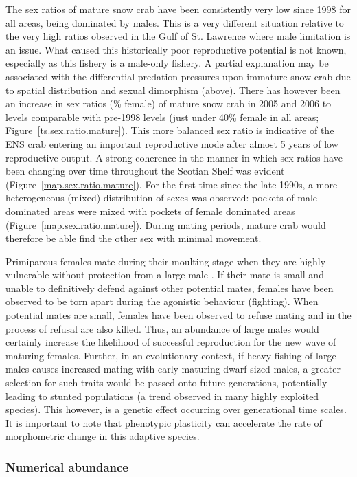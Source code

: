 \documentclass[11pt]{article}
\begin{document}
The sex ratios of mature snow crab have been consistently very low since 1998 for all areas, being dominated by males. This is a very different situation relative to the very high ratios observed in the Gulf of St. Lawrence where male limitation is an issue. What caused this historically poor reproductive potential is not known, especially as this fishery is a male-only fishery. A partial explanation may be associated with the differential predation pressures upon immature snow crab due to spatial distribution and sexual dimorphism (above). There has however been an increase in sex ratios (\% female) of mature snow crab in 2005 and 2006 to levels comparable with pre-1998 levels (just under 40\% female in all areas; Figure~\ref{ts.sex.ratio.mature}). This more balanced sex ratio is indicative of the ENS crab entering an important reproductive mode after almost 5 years of low reproductive output. A strong coherence in the manner in which sex ratios have been changing over time throughout the Scotian Shelf was evident (Figure~\ref{map.sex.ratio.mature}). For the first time since the late 1990s, a more heterogeneous (mixed) distribution of sexes was observed: pockets of male dominated areas were mixed with pockets of female dominated areas (Figure~\ref{map.sex.ratio.mature}). During mating periods, mature crab would therefore be able find the other sex with minimal movement.

Primiparous females mate during their moulting stage when they are highly vulnerable without protection from a large male \citep{Watson1972, Hooper1986}. If their mate is small and unable to definitively defend against other potential mates, females have been observed to be torn apart during the agonistic behaviour (fighting). When potential mates are small, females have been observed to refuse mating and in the process of refusal are also killed. Thus, an abundance of large males would certainly increase the likelihood of successful reproduction for the new wave of maturing females. Further, in an evolutionary context, if heavy fishing of large males causes increased mating with early maturing dwarf sized males, a greater selection for such traits would be passed onto future generations, potentially leading to stunted populations (a trend observed in many highly exploited species). This however, is a genetic effect occurring over generational time scales. It is important to note that phenotypic plasticity can accelerate the rate of morphometric change in this adaptive species.


\subsubsection{Numerical abundance} 
\end{document}
